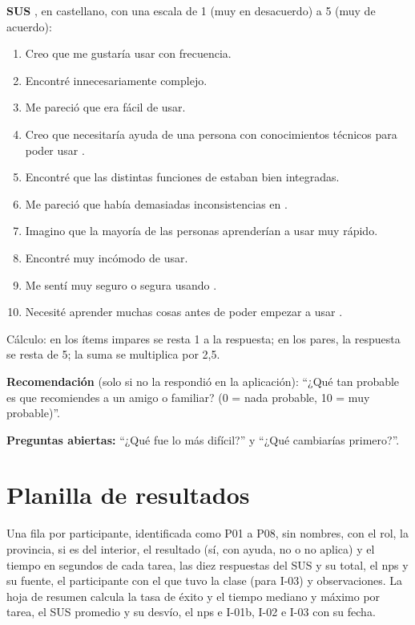 \textbf{SUS} \citep{brooke1996}, en castellano, con una escala de 1 (muy
en desacuerdo) a 5 (muy de acuerdo):

\begin{enumerate}
    \item Creo que me gustaría usar \sistema{} con frecuencia.
    \item Encontré \sistema{} innecesariamente complejo.
    \item Me pareció que \sistema{} era fácil de usar.
    \item Creo que necesitaría ayuda de una persona con conocimientos
          técnicos para poder usar \sistema{}.
    \item Encontré que las distintas funciones de \sistema{} estaban bien
          integradas.
    \item Me pareció que había demasiadas inconsistencias en \sistema{}.
    \item Imagino que la mayoría de las personas aprenderían a usar
          \sistema{} muy rápido.
    \item Encontré \sistema{} muy incómodo de usar.
    \item Me sentí muy seguro o segura usando \sistema{}.
    \item Necesité aprender muchas cosas antes de poder empezar a usar
          \sistema{}.
\end{enumerate}

Cálculo: en los ítems impares se resta 1 a la respuesta; en los pares,
la respuesta se resta de 5; la suma se multiplica por 2,5.

\textbf{Recomendación} (solo si no la respondió en la aplicación): ``¿Qué
tan probable es que recomiendes \sistema{} a un amigo o familiar? (0 =
nada probable, 10 = muy probable)''.

\textbf{Preguntas abiertas:} ``¿Qué fue lo más difícil?'' y ``¿Qué
cambiarías primero?''.

\section{Planilla de resultados}

Una fila por participante, identificada como P01 a P08, sin nombres, con
el rol, la provincia, si es del interior, el resultado (sí, con ayuda,
no o no aplica) y el tiempo en segundos de cada tarea, las diez
respuestas del SUS y su total, el \gls{nps} y su fuente, el participante
con el que tuvo la clase (para I-03) y observaciones. La hoja de resumen
calcula la tasa de éxito y el tiempo mediano y máximo por tarea, el SUS
promedio y su desvío, el \gls{nps} e I-01b, I-02 e I-03 con su fecha.
